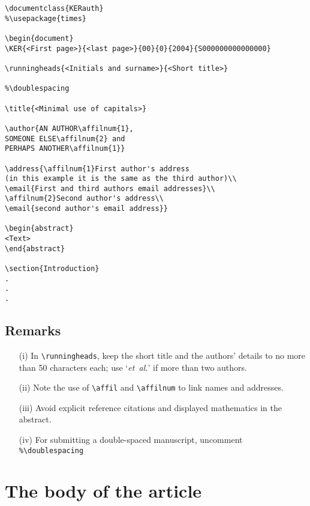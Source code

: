 \documentclass{KERauth}
\begin{document}
\begin{verbatim}
\documentclass{KERauth}
%\usepackage{times}

\begin{document}
\KER{<First page>}{<last page>}{00}{0}{2004}{S000000000000000}

\runningheads{<Initials and surname>}{<Short title>}

%\doublespacing

\title{<Minimal use of capitals>}

\author{AN AUTHOR\affilnum{1},
SOMEONE ELSE\affilnum{2} and
PERHAPS ANOTHER\affilnum{1}}

\address{\affilnum{1}First author's address
(in this example it is the same as the third author)\\
\email{First and third authors email addresses}\\
\affilnum{2}Second author's address\\
\email{second author's email address}}

\begin{abstract}
<Text>
\end{abstract}

\section{Introduction}
.
.
.
\end{verbatim}

\subsection{Remarks}
\begin{enumerate}
\item[(i)] In \verb"\runningheads", keep the short title and the
authors' details to no more than 50 characters each; use
`\emph{et~al.}' if more than two authors.

\item[(ii)]
Note the use of \verb"\affil" and \verb"\affilnum"
to link names and addresses.

\item[(iii)] Avoid explicit reference citations and displayed
mathematics in the abstract.


\item[(iv)] For submitting a double-spaced manuscript, uncomment
\verb"%\doublespacing"

\end{enumerate}

\section{The body of the article}
\end{document}

